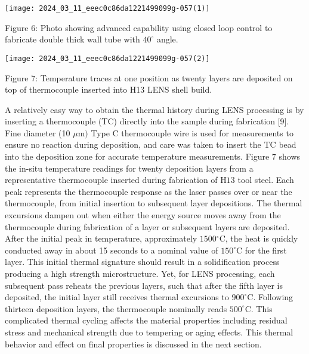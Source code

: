 \documentclass[10pt]{article}
\begin{document}
\begin{center}
\texttt{[image: 2024\_03\_11\_eeec0c86da1221499099g-057(1)]}
\end{center}

Figure 6: Photo showing advanced capability using closed loop control to fabricate double thick wall tube with $40^{\circ}$ angle.

\begin{center}
\texttt{[image: 2024\_03\_11\_eeec0c86da1221499099g-057(2)]}
\end{center}

Figure 7: Temperature traces at one position as twenty layers are deposited on top of thermocouple inserted into H13 LENS shell build.

A relatively easy way to obtain the thermal history during LENS processing is by inserting a thermocouple (TC) directly into the sample during fabrication [9]. Fine diameter (10 $\mu \mathrm{m})$ Type $\mathrm{C}$ thermocouple wire is used for measurements to ensure no reaction during deposition, and care was taken to insert the TC bead into the deposition zone for accurate temperature measurements. Figure 7 shows the in-situ temperature readings for twenty deposition layers from a representative thermocouple inserted during fabrication of $\mathrm{H} 13$ tool steel. Each peak represents the thermocouple response as the laser passes over or near the thermocouple, from initial insertion to subsequent layer depositions. The thermal excursions dampen out when either the energy source moves away from the thermocouple during fabrication of a layer or subsequent layers are deposited. After the initial peak in temperature, approximately $1500{ }^{\circ} \mathrm{C}$, the heat is quickly conducted away in about 15 seconds to a nominal value of $150^{\circ} \mathrm{C}$ for the first layer. This initial thermal signature should result in a solidification process producing a high strength microstructure. Yet, for LENS processing, each subsequent pass reheats the previous layers, such that after the fifth layer is deposited, the initial layer still receives thermal excursions to $900^{\circ} \mathrm{C}$. Following thirteen deposition layers, the thermocouple nominally reads $500^{\circ} \mathrm{C}$. This complicated thermal cycling affects the material properties including residual stress and mechanical strength due to tempering or aging effects. This thermal behavior and effect on final properties is discussed in the next section.
\end{document}
